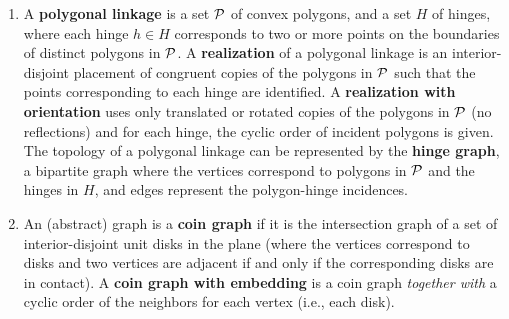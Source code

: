 \documentclass[runningheads]{article}
\newcommand{\PP}{{\cal P}} %
\begin{document}
\begin{enumerate}
\item A \textbf{polygonal linkage} is a set $\PP$ of convex polygons, and a set $H$ of hinges, where each hinge $h\in H$ corresponds to two or more points on the boundaries of distinct polygons in $\PP$. A \textbf{realization} of a polygonal linkage is an interior-disjoint placement of congruent copies of the polygons in $\PP$ such that the points corresponding to each hinge are identified. A \textbf{realization with orientation} uses only translated or rotated copies of the polygons in $\PP$ (no reflections) and for each hinge, the cyclic order of incident polygons is given. The topology of a polygonal linkage can be represented by the \textbf{hinge graph}, a bipartite graph where the vertices correspond to polygons in $\PP$ and the hinges in $H$, and edges represent the polygon-hinge incidences.
\item An (abstract) graph is a \textbf{coin graph} if it is the intersection graph of a set of interior-disjoint unit disks in the plane (where the vertices correspond to disks and two vertices are adjacent if and only if the corresponding disks are in contact). A \textbf{coin graph with embedding} is a coin graph \emph{together with} a cyclic order of the neighbors for each vertex (i.e., each disk).
\end{enumerate}
\end{document}
